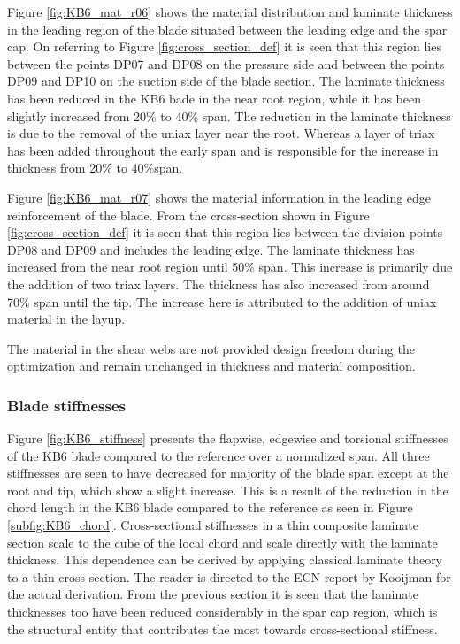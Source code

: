 Figure \ref{fig:KB6_mat_r06} shows the material distribution and laminate thickness in the leading region of the blade situated between the leading edge and the spar cap. On referring to Figure \ref{fig:cross_section_def} it is seen that this region lies between the points DP07 and DP08 on the pressure side and between the points DP09 and DP10 on the suction side of the blade section. The laminate thickness has been reduced in the KB6 bade in the near root region, while it has been slightly increased from 20\% to 40\% span. The reduction in the laminate thickness is due to the removal of the uniax layer near the root. Whereas a layer of triax has been added throughout the early span and is responsible for the increase in thickness from 20\% to 40\%span.

Figure \ref{fig:KB6_mat_r07} shows the material information in the leading edge reinforcement of the blade. From the cross-section shown in Figure \ref{fig:cross_section_def} it is seen that this region lies between the division points DP08 and DP09 and includes the leading edge. The laminate thickness has increased from the near root region until 50\% span. This increase is primarily due the addition of two triax layers. The thickness has also increased from around 70\% span until the tip. The increase here is attributed to the addition of uniax material in the layup. 

The material in the shear webs are not provided design freedom during the optimization and remain unchanged in thickness and material composition.

\subsubsection*{Blade stiffnesses}
Figure \ref{fig:KB6_stiffness} presents the flapwise, edgewise and torsional stiffnesses of the KB6 blade compared to the reference over a normalized span. All three stiffnesses are seen to have decreased for majority of the blade span except at the root and tip, which show a slight increase. This is a result of the reduction in the chord length in the KB6 blade compared to the reference as seen in Figure \ref{subfig:KB6_chord}. Cross-sectional stiffnesses in a thin composite laminate section scale to the cube of the local chord and scale directly with the laminate thickness. This dependence can be derived by applying classical laminate theory to a thin cross-section. The reader is directed to the ECN report by Kooijman \cite{kooijman1996bending} for the actual derivation. From the previous section it is seen that the laminate thicknesses too have been reduced considerably in the spar cap region, which is the structural entity that contributes the most towards cross-sectional stiffness. 


